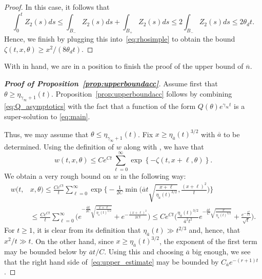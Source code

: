 \documentclass[11pt]{article}    %
\begin{document}
\begin{proof}
\medskip


\medskip

In this case, it follows that
\[
	\int_0^t Z_2(s)ds
		\leq \int_{B_-}Z_2(s)ds + \int_{B_+}Z_2(s)ds
		\leq 2 \int_{B_-} Z_2(s) ds
		\leq 2 \theta_d t.
\]
Hence, we finish by plugging this into~\eqref{eq:rhosimple} to obtain the bound $\zeta(t,x,\theta) \geq x^2/(8\theta_d t)$.
\end{proof}

With  in hand, we are in a position to finish the proof of the upper bound of $\overline n$.
\begin{proof}[{\bf Proof of Proposition~\ref{prop:upperboundacc}}]

Assume first that $\theta \geq \eta_{\gamma_\infty + 1}(t)$. Proposition~\ref{prop:upperboundacc} follows by combining \eqref{eq:Q_asymptotics} with the fact that a function of the form $Q(\theta)e^{\gamma_\infty  t}$ is a super-solution to \eqref{eq:main}.

Thus, we may assume that $\theta \leq \eta_{\gamma_\infty + 1}(t)$.
Fix $x \geq \eta_{\overline a}(t)^{3/2}$ with $\overline a$ to be determined.  Using the definition of $w$ along with , we have that
\[
	w(t,x,\theta)
		\leq C e^{Ct} \sum_{\ell=0}^\infty \exp\left\{ - \zeta(t,x+\ell,\theta)\right\}.
\]
We obtain a very rough bound on $w$ in the following way:
\begin{equation}\label{eq:upper_estimate}
\begin{split}
	w(t,&x,\theta) \leq \frac{Ce^{Ct}}{t} \sum_{\ell = 0}^\infty \exp\Big\{ - \frac{1}{2C} \min\Big(\overline{a} t\sqrt{ \frac{x+\ell}{\eta_{\overline a}(t)^{3/2}}},\frac{(x+\ell)^2}{t}\Big)\Big\} \\
		&\leq \displaystyle\frac{Ce^{Ct}}{t} \sum_{\ell = 0}^\infty 
		 \Big(e^{ - \frac{\overline a t}{2C}\sqrt{\frac{x+\ell}{\eta_{\overline a}(t)^{3/2}}}}
			+e^{-\frac{(x+\ell)^2}{2Ct}}\Big)
		\leq C e^{Ct} \Big(\frac{\eta_{\overline a}(t)^{3/2}}{\overline a^2 t^2} e^{ - \frac{\overline a t}{C}\sqrt{\frac{x}{\eta_{\overline a}(t)^{3/2}}}}
			+ \frac{e^{-\frac{x^2}{Ct}}}{\sqrt{t}}\Big).
\end{split}
\end{equation}
For $t\geq 1$, it is clear from its definition that $\eta_{\overline a}(t) \gg t^{2/3}$ and, hence, that $x^2/t \gg t$.  On the other hand, since $x \geq \eta_{\overline a}(t)^{3/2}$, the exponent of the first term may be bounded below by $\overline a t / C$.  Using this and choosing $\overline a$ big enough, we see that the right hand side of~\eqref{eq:upper_estimate} may be bounded by $C_{\overline a}e^{-(r+1) t}$.


\end{proof}
\end{document}
